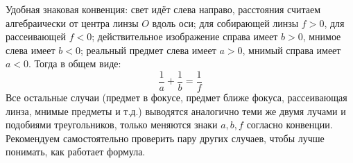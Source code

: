 \documentclass[12pt, a4paper]{article}%
\begin{document}
Удобная знаковая конвенция: свет идёт слева направо, расстояния считаем алгебраически от центра линзы $O$ вдоль оси; для собирающей линзы $f>0$, для рассеивающей $f<0$; действительное изображение справа имеет $b>0$, мнимое слева имеет $b<0$; реальный предмет слева имеет $a>0$, мнимый справа имеет $a<0$. Тогда в общем виде:
\[
\boxed{\ \frac{1}{a}+\frac{1}{b}=\frac{1}{f}\ }
\]
Все остальные случаи (предмет в фокусе, предмет ближе фокуса, рассеивающая линза,
мнимые предметы и т.д.) выводятся аналогично теми же двумя лучами 
и подобиями треугольников, только меняются знаки $a,b,f$ согласно конвенции. Рекомендуем самостоятельно проверить пару других случаев,  чтобы лучше понимать, как работает формула.
\end{document}
